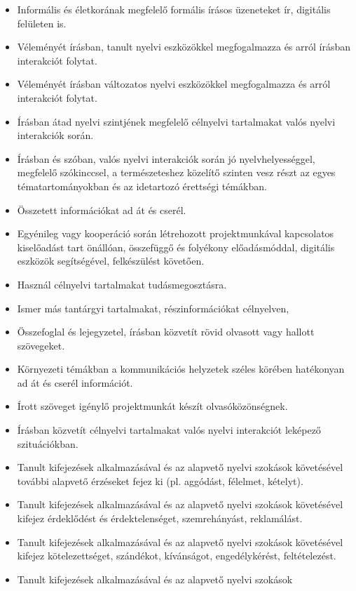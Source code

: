\begin{itemize}
\item
  Informális és életkorának megfelelő formális írásos üzeneteket ír,
  digitális felületen is.
\item
  Véleményét írásban, tanult nyelvi eszközökkel megfogalmazza és arról
  írásban interakciót folytat.
\item
  Véleményét írásban változatos nyelvi eszközökkel megfogalmazza és
  arról interakciót folytat.
\item
  Írásban átad nyelvi szintjének megfelelő célnyelvi tartalmakat valós
  nyelvi interakciók során.
\item
  Írásban és szóban, valós nyelvi interakciók során jó
  nyelvhelyességgel, megfelelő szókinccsel, a természeteshez közelítő
  szinten vesz részt az egyes tématartományokban és az idetartozó
  érettségi témákban.
\item
  Összetett információkat ad át és cserél.
\item
  Egyénileg vagy kooperáció során létrehozott projektmunkával
  kapcsolatos kiselőadást tart önállóan, összefüggő és folyékony
  előadásmóddal, digitális eszközök segítségével, felkészülést követően.
\item
  Használ célnyelvi tartalmakat tudásmegosztásra.
\item
  Ismer más tantárgyi tartalmakat, részinformációkat célnyelven,
\item
  Összefoglal és lejegyzetel, írásban közvetít rövid olvasott vagy
  hallott szövegeket.
\item
  Környezeti témákban a kommunikációs helyzetek széles körében
  hatékonyan ad át és cserél információt.
\item
  Írott szöveget igénylő projektmunkát készít olvasóközönségnek.
\item
  Írásban közvetít célnyelvi tartalmakat valós nyelvi interakciót
  leképező szituációkban.
\item
  Tanult kifejezések alkalmazásával és az alapvető nyelvi szokások
  követésével további alapvető érzéseket fejez ki (pl. aggódást,
  félelmet, kételyt).
\item
  Tanult kifejezések alkalmazásával és az alapvető nyelvi szokások
  követésével kifejez érdeklődést és érdektelenséget, szemrehányást,
  reklamálást.
\item
  Tanult kifejezések alkalmazásával és az alapvető nyelvi szokások
  követésével kifejez kötelezettséget, szándékot, kívánságot,
  engedélykérést, feltételezést.
\item
  Tanult kifejezések alkalmazásával és az alapvető nyelvi szokások

\end{itemize}

